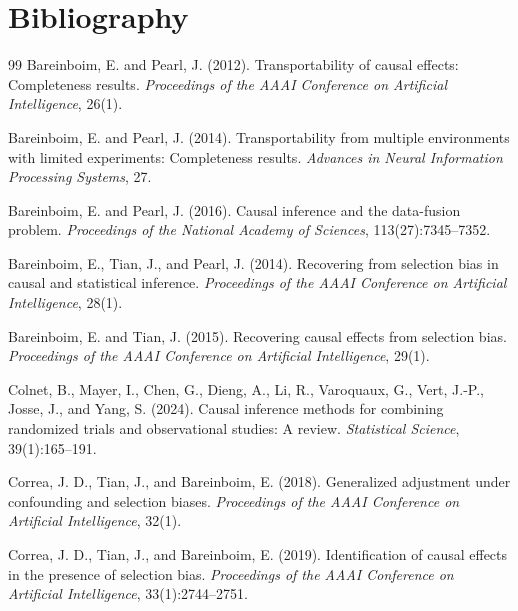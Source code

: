 \documentclass[11pt]{article}
\theoremstyle{definition}
\theoremstyle{plain}
\theoremstyle{remark}
\begin{document}
\section*{Bibliography}
\begin{thebibliography}{99}
Bareinboim, E. and Pearl, J. (2012).
Transportability of causal effects: Completeness results.
\emph{Proceedings of the AAAI Conference on Artificial Intelligence}, 26(1).

Bareinboim, E. and Pearl, J. (2014).
Transportability from multiple environments with limited experiments:
Completeness results.
\emph{Advances in Neural Information Processing Systems}, 27.

Bareinboim, E. and Pearl, J. (2016).
Causal inference and the data-fusion problem.
\emph{Proceedings of the National Academy of Sciences}, 113(27):7345--7352.

Bareinboim, E., Tian, J., and Pearl, J. (2014).
Recovering from selection bias in causal and statistical inference.
\emph{Proceedings of the AAAI Conference on Artificial Intelligence}, 28(1).

Bareinboim, E. and Tian, J. (2015).
Recovering causal effects from selection bias.
\emph{Proceedings of the AAAI Conference on Artificial Intelligence}, 29(1).

Colnet, B., Mayer, I., Chen, G., Dieng, A., Li, R., Varoquaux, G.,
Vert, J.-P., Josse, J., and Yang, S. (2024).
Causal inference methods for combining randomized trials and observational
studies: A review.
\emph{Statistical Science}, 39(1):165--191.

Correa, J. D., Tian, J., and Bareinboim, E. (2018).
Generalized adjustment under confounding and selection biases.
\emph{Proceedings of the AAAI Conference on Artificial Intelligence}, 32(1).

Correa, J. D., Tian, J., and Bareinboim, E. (2019).
Identification of causal effects in the presence of selection bias.
\emph{Proceedings of the AAAI Conference on Artificial Intelligence},
33(1):2744--2751.


\end{thebibliography}
\end{document}
